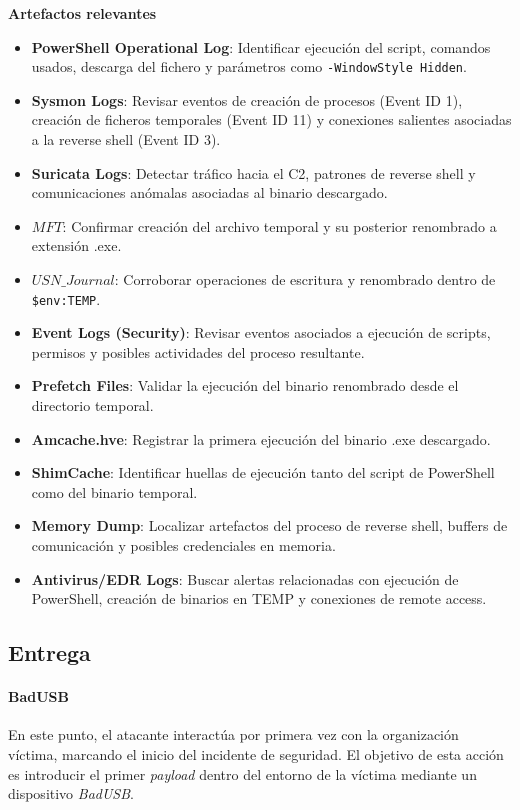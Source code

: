 \textbf{Artefactos relevantes}
\begin{itemize}
    \item \textbf{PowerShell Operational Log}: Identificar ejecución del script, comandos usados, descarga del fichero y parámetros como \texttt{-WindowStyle Hidden}.
    \item \textbf{Sysmon Logs}: Revisar eventos de creación de procesos (Event ID 1), creación de ficheros temporales (Event ID 11) y conexiones salientes asociadas a la reverse shell (Event ID 3).
    \item \textbf{Suricata Logs}: Detectar tráfico hacia el C2, patrones de reverse shell y comunicaciones anómalas asociadas al binario descargado.
    \item \textbf{$MFT$}: Confirmar creación del archivo temporal y su posterior renombrado a extensión .exe.
    \item \textbf{$USN\_Journal$}: Corroborar operaciones de escritura y renombrado dentro de \texttt{\$env:TEMP}.
    \item \textbf{Event Logs (Security)}: Revisar eventos asociados a ejecución de scripts, permisos y posibles actividades del proceso resultante.
    \item \textbf{Prefetch Files}: Validar la ejecución del binario renombrado desde el directorio temporal.
    \item \textbf{Amcache.hve}: Registrar la primera ejecución del binario .exe descargado.
    \item \textbf{ShimCache}: Identificar huellas de ejecución tanto del script de PowerShell como del binario temporal.
    \item \textbf{Memory Dump}: Localizar artefactos del proceso de reverse shell, buffers de comunicación y posibles credenciales en memoria.
    \item \textbf{Antivirus/EDR Logs}: Buscar alertas relacionadas con ejecución de PowerShell, creación de binarios en TEMP y conexiones de remote access.
\end{itemize}

\subsection{Entrega}

\paragraph{BadUSB} En este punto, el atacante interactúa por primera vez con la organización víctima, marcando el inicio del incidente de seguridad. El objetivo de esta acción es introducir el primer \textit{payload} dentro del entorno de la víctima mediante un dispositivo \textit{BadUSB}.

